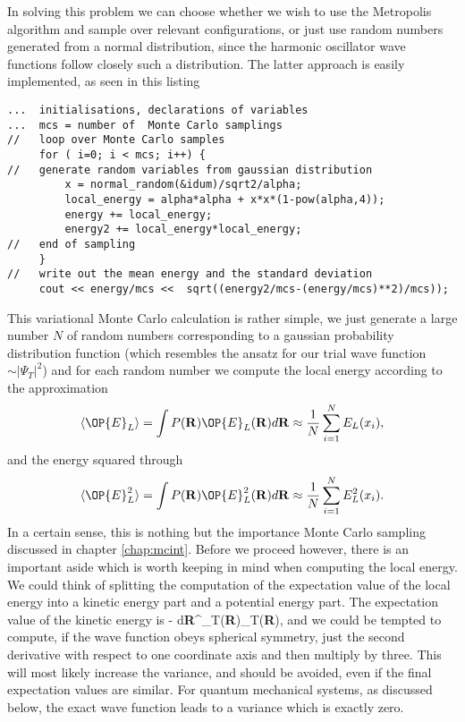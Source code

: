 In solving this problem we can choose whether we wish to use the Metropolis
algorithm and sample over relevant configurations, or just use
random numbers generated from a normal distribution, since the 
harmonic oscillator wave functions follow closely such a 
distribution. 
The latter approach is easily implemented, as seen in this listing
\begin{lstlisting}
...  initialisations, declarations of variables
...  mcs = number of  Monte Carlo samplings
//   loop over Monte Carlo samples
     for ( i=0; i < mcs; i++) {
//   generate random variables from gaussian distribution 
         x = normal_random(&idum)/sqrt2/alpha;
         local_energy = alpha*alpha + x*x*(1-pow(alpha,4));
         energy += local_energy;
         energy2 += local_energy*local_energy;
//   end of sampling
     }
//   write out the mean energy and the standard deviation
     cout << energy/mcs <<  sqrt((energy2/mcs-(energy/mcs)**2)/mcs));
\end{lstlisting}
This variational Monte Carlo calculation is rather simple, we just generate a large
number $N$ of random numbers corresponding to a gaussian probability distribution function
(which resembles the ansatz for our trial wave function 
$\sim |\Psi_T|^2$) and for each random number we compute the 
local energy according to the approximation
\[
  \langle \OP{E}_L \rangle =\int P({\bf R})\OP{E}_L({\bf R}) d{\bf R}\approx 
  \frac{1}{N}\sum_{i=1}^{N}E_L(x_i),
\]
and the energy squared through
\[
  \langle \OP{E}_L^2 \rangle =\int P({\bf R})\OP{E}_L^2({\bf R}) d{\bf R}\approx 
  \frac{1}{N}\sum_{i=1}^{N}E_L^2(x_i).
\]
In a certain sense, this is nothing but the importance Monte Carlo
sampling discussed in chapter \ref{chap:mcint}.
Before we proceed however, there is an important aside which 
is worth keeping in mind when computing the local energy.
We could think of splitting the computation of the expectation
value of the local energy into a kinetic energy part and a potential
energy part. The expectation value of the kinetic energy is
\be
   -
        {\int d{\bf R}\Psi^{\ast}_T({\bf R})\Psi_T({\bf R})},
\ee    
and we could be tempted to compute, if the wave function obeys spherical
symmetry, just the second derivative with respect to one coordinate
axis and then multiply by three. This will most likely increase the 
variance, and should be avoided, even if the final expectation
values are similar. For quantum mechanical systems, as discussed below, the exact wave 
function leads to a variance which is exactly zero. 


